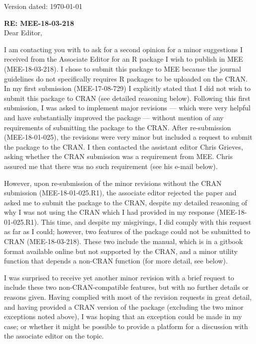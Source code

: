 \documentclass[12pt,letterpaper]{article}
\begin{document}
\begin{flushright}
Version dated: \today
\end{flushright}

\textbf{RE: MEE-18-03-218}\\
\bigskip
Dear Editor,\\
\bigskip

\noindent I am contacting you with to ask for a second opinion for a minor suggestions I received from the Associate Editor for an R package I wish to publish in MEE (MEE-18-03-218).
I chose to submit this package to MEE because the journal guidelines do not specifically requires R packages to be uploaded on the CRAN.
In my first submission (MEE-17-08-729) I explicitly stated that I did not wish to submit this package to CRAN (see detailed reasoning below).
Following this first submission, I was asked to implement major revisions --- which were very helpful and have substantially improved the package --- without mention of any requirements of submitting the package to the CRAN.
After re-submission (MEE-18-01-025), the revisions were very minor but included a request to submit the package to the CRAN.
I then contacted the assistant editor Chris Grieves, asking whether the CRAN submission was a requirement from MEE.
Chris assured me that there was no such requirement (see his e-mail below). 

However, upon re-submission of the minor revisions without the CRAN submission (MEE-18-01-025.R1), the associate editor rejected the paper and asked me to submit the package to the CRAN, despite my detailed reasoning of why I was not using the CRAN which I had provided in my response (MEE-18-01-025.R1).
This time, and despite my misgivings, I did comply with this request as far as I could; however, two features of the package could not be submitted to CRAN (MEE-18-03-218).
These two include the manual, which is in a gitbook format available online but not supported by the CRAN, and a minor utility function that depends a non-CRAN function (for more detail, see below).

I was surprised to receive yet another minor revision with a brief request to include these two non-CRAN-compatible features, but with no further details or reasons given.
Having complied with most of the revision requests in great detail, and having provided a CRAN version of the package (excluding the two minor exceptions noted above), I was hoping that an exception could be made in my case; or whether it might be possible to provide a platform for a discussion with the associate editor on the topic.
\end{document}
